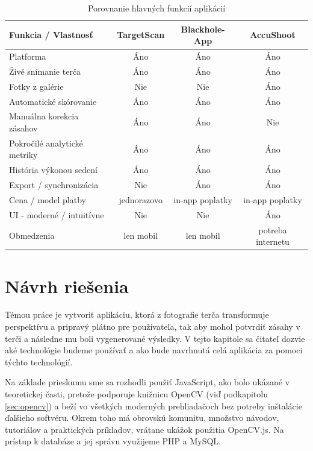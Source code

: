 \begin{table}[h]
  \centering
  \small
  \begin{tabular}{lccc}
    \toprule
    \textbf{Funkcia / Vlastnosť} 
      & \textbf{TargetScan} 
      & \textbf{Blackhole-App} 
      & \textbf{AccuShoot} \\
    \midrule
    Platforma 
      & Áno 
      & Áno 
      & Áno \\
    Živé snímanie terča 
      & Áno 
      & Áno 
      & Áno \\
    Fotky z galérie 
      & Nie 
      & Nie 
      & Áno \\
    Automatické skórovanie 
      & Áno 
      & Áno 
      & Áno \\
    Manuálna korekcia zásahov 
      & Áno 
      & Áno 
      & Nie \\
    Pokročilé analytické metriky 
      & Áno 
      & Áno 
      & Áno \\
    História výkonou sedení
      & Áno 
      & Áno 
      & Áno \\
    Export / synchronizácia 
      & Nie 
      & Áno 
      & Áno \\
    Cena / model platby 
      & jednorazovo 
      & in-app poplatky 
      & in-app poplatky \\
    UI - moderné / intuitívne 
      & Nie 
      & Nie 
      & Áno \\
    Obmedzenia 
      & len mobil 
      & len mobil 
      & potreba internetu \\
    \bottomrule
  \end{tabular}
  \caption{Porovnanie hlavných funkcií aplikácií}
  \label{tab:porovnanie-fajky-krizik}
\end{table}



\section{Návrh riešenia}
Témou práce je vytvoriť aplikáciu, ktorá z fotografie terča transformuje perspektívu a pripravý plátno pre používateľa, 
tak aby mohol potvrdiť zásahy v terči a následne mu boli vygenerované výsledky. V tejto kapitole sa čitateľ dozvie aké technológie
budeme používať a ako bude navrhnutá celá aplikácia za pomoci týchto technológií.

Na základe prieskumu sme sa rozhodli použiť JavaScript, ako bolo ukázané v teoretickej časti, pretože podporuje knižnicu 
OpenCV (viď podkapitolu \ref{sec:opencv}) a beží vo všetkých moderných prehliadačoch bez potreby inštalácie ďalšieho softvéru. 
Okrem toho má obrovskú komunitu, množstvo návodov, tutoriálov a praktických príkladov, vrátane ukážok použitia OpenCV.js. 
Na prístup k databáze a jej správu využijeme PHP a MySQL.

